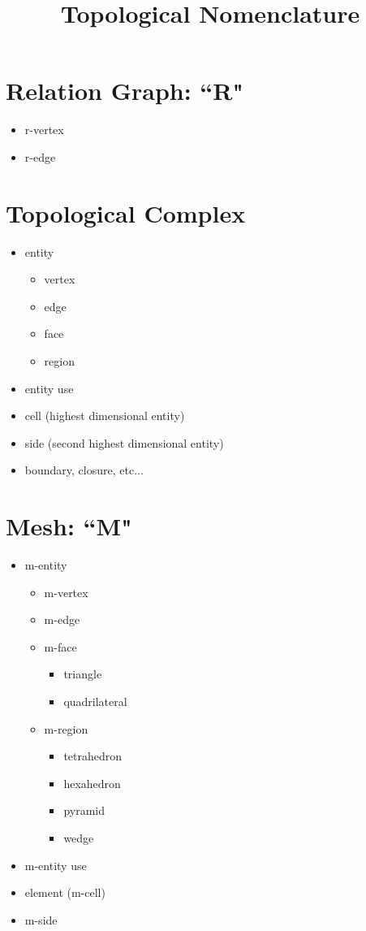 \documentclass[twocolumn]{article}
\title{Topological Nomenclature}
\begin{document}
\maketitle
\section{Relation Graph: ``R"}
\begin{itemize}
\item r-vertex
\item r-edge
\end{itemize}
\section{Topological Complex}
\begin{itemize}
\item entity
\begin{itemize}
\item vertex
\item edge
\item face
\item region
\end{itemize}
\item entity use
\item cell (highest dimensional entity)
\item side (second highest dimensional entity)
\item boundary, closure, etc...
\end{itemize}
\section{Mesh: ``M"}
\begin{itemize}
\item m-entity
\begin{itemize}
\item m-vertex
\item m-edge
\item m-face
\begin{itemize}
\item triangle
\item quadrilateral
\end{itemize}
\item m-region
\begin{itemize}
\item tetrahedron
\item hexahedron
\item pyramid
\item wedge
\end{itemize}
\end{itemize}
\item m-entity use
\item element (m-cell)
\item m-side
\end{itemize}
\end{document}
